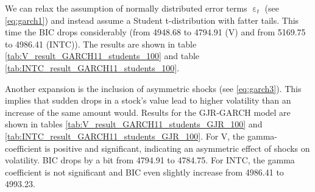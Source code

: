 \begin{table}[h!]
    \centering
    
    \caption{}
    \label{tab:INTC_result_GARCH11_100}
\end{table}{}

We can relax the assumption of normally distributed error terms $\upepsilon_t$ (see \ref{eq:garch1}) and instead assume a Student t-distribution with fatter tails. This time the BIC drops considerably (from 4948.68 to 4794.91 (V) and from 5169.75 to 4986.41 (INTC)). The results are shown in table \ref{tab:V_result_GARCH11_students_100} and table \ref{tab:INTC_result_GARCH11_students_100}. 

\begin{table}[h]
    \centering
    
    \caption{}
    \label{tab:V_result_GARCH11_students_100}
\end{table}{}

\begin{table}[h!]
    \centering
    
    \caption{}
    \label{tab:INTC_result_GARCH11_students_100}
\end{table}{}

Another expansion is the inclusion of asymmetric shocks (see \ref{eq:garch3}). This implies that sudden drops in a stock's value lead to higher volatility than an increase of the same amount would. Results for the GJR-GARCH model are shown in tables \ref{tab:V_result_GARCH11_students_GJR_100} and \ref{tab:INTC_result_GARCH11_students_GJR_100}. For V, the gamma-coefficient is positive and significant, indicating an asymmetric effect of shocks on volatility. BIC drops by a bit from 4794.91 to 4784.75. For INTC, the gamma coefficient is not significant and BIC even slightly increase from 4986.41 to 4993.23.

\begin{table}[h]
    \centering
    
    \caption{}
    \label{tab:V_result_GARCH11_students_GJR_100}
\end{table}{}

\begin{table}[h!]
    \centering
    
    \caption{}
    \label{tab:INTC_result_GARCH11_students_GJR_100}
\end{table}{}

